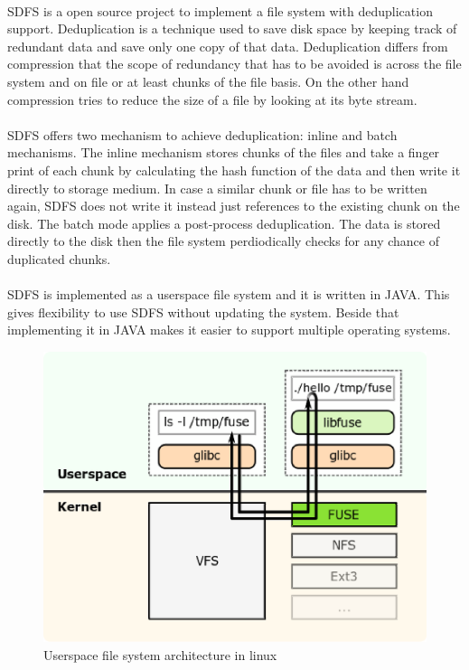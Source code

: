 \paragraph{}
SDFS is a open source project to implement a file system with deduplication support. Deduplication is a technique
used to save disk space by keeping track of redundant data and save only one copy of that data. Deduplication differs
from compression that the scope of redundancy that has to be avoided is across the file system and on file or at
 least chunks of the file basis. On the other hand compression tries to reduce the size of a file by looking at its byte stream.

\paragraph{}
SDFS offers two mechanism to achieve deduplication: inline and batch mechanisms. The inline mechanism stores chunks of the files and
take a finger print of each chunk by calculating the hash function of the data and then write it directly to storage medium. In case
a similar chunk or file has to be written again, SDFS does not write it instead just references to the existing chunk on the disk.
The batch mode applies a post-process deduplication. The data is stored directly to the disk then the file system perdiodically checks 
for any chance of duplicated chunks.



\paragraph{}
SDFS is implemented as a userspace file system and it is written in JAVA. This gives flexibility to use SDFS without updating the system.
Beside that implementing it in JAVA makes it easier to support multiple operating systems.
\begin{figure}
\label{fig:fuse}
\begin{center}
\includegraphics[scale=.55]{FUSE.eps}
\caption{Userspace file system architecture in linux\cite{web:wiki-fuse}}
\end{center}
\end{figure}

